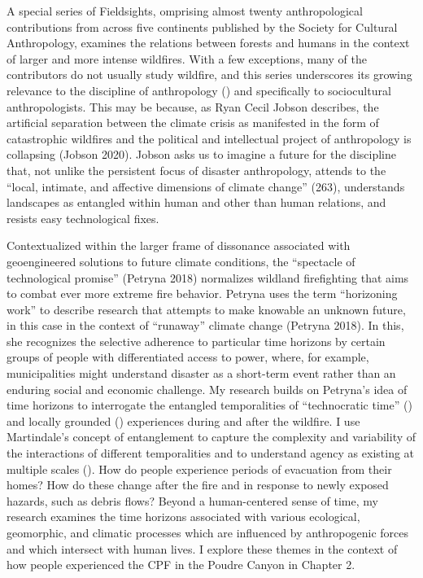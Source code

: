 \documentclass[
]{article}
\begin{document}
A special series of Fieldsights, omprising almost twenty anthropological contributions from across five continents published by the Society for Cultural Anthropology, examines the relations between forests and humans in the context of larger and more intense wildfires. With a few exceptions, many of the contributors do not usually study wildfire, and this series underscores its growing relevance to the discipline of anthropology () and specifically to sociocultural anthropologists. This may be because, as Ryan Cecil Jobson describes, the artificial separation between the climate crisis as manifested in the form of catastrophic wildfires and the political and intellectual project of anthropology is collapsing (Jobson 2020). Jobson asks us to imagine a future for the discipline that, not unlike the persistent focus of disaster anthropology, attends to the ``local, intimate, and affective dimensions of climate change'' (263), understands landscapes as entangled within human and other than human relations, and resists easy technological fixes.

Contextualized within the larger frame of dissonance associated with geoengineered solutions to future climate conditions, the ``spectacle of technological promise'' (Petryna 2018) normalizes wildland firefighting that aims to combat ever more extreme fire behavior. Petryna uses the term ``horizoning work'' to describe research that attempts to make knowable an unknown future, in this case in the context of ``runaway'' climate change (Petryna 2018). In this, she recognizes the selective adherence to particular time horizons by certain groups of people with differentiated access to power, where, for example, municipalities might understand disaster as a short-term event rather than an enduring social and economic challenge. My research builds on Petryna's idea of time horizons to interrogate the entangled temporalities of ``technocratic time'' () and locally grounded () experiences during and after the wildfire. I use Martindale's concept of entanglement to capture the complexity and variability of the interactions of different temporalities and to understand agency as existing at multiple scales (). How do people experience periods of evacuation from their homes? How do these change after the fire and in response to newly exposed hazards, such as debris flows? Beyond a human-centered sense of time, my research examines the time horizons associated with various ecological, geomorphic, and climatic processes which are influenced by anthropogenic forces and which intersect with human lives. I explore these themes in the context of how people experienced the CPF in the Poudre Canyon in Chapter 2.
\end{document}

